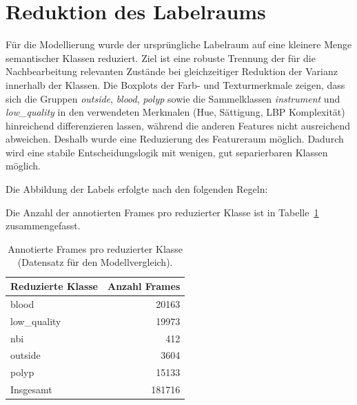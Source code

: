 \section{Reduktion des Labelraums}

Für die Modellierung wurde der ursprüngliche Labelraum auf eine kleinere Menge semantischer Klassen reduziert. Ziel ist eine robuste Trennung der für die Nachbearbeitung relevanten Zustände bei gleichzeitiger Reduktion der Varianz innerhalb der Klassen. Die Boxplots der Farb- und Texturmerkmale zeigen, dass sich die Gruppen \emph{outside}, \emph{blood}, \emph{polyp} sowie die Sammelklassen \emph{instrument} und \emph{low\_quality} in den verwendeten Merkmalen (Hue, Sättigung, LBP Komplexität) hinreichend differenzieren lassen, während die anderen Features nicht ausreichend abweichen. Deshalb wurde eine Reduzierung des Featureraum möglich. Dadurch wird eine stabile Entscheidungslogik mit wenigen, gut separierbaren Klassen möglich.

Die Abbildung der Labels erfolgte nach den folgenden Regeln:
\begin{table}[htbp]
    \centering
    \caption{Abbildung der ursprünglichen Labels auf reduzierte Klassen.}
    \label{tab:label_reduction}
\end{table}

Die Anzahl der annotierten Frames pro reduzierter Klasse ist in Tabelle~\ref{tab:label_counts_reduced} zusammengefasst.
\begin{table}[htbp]
    \centering
    \caption{Annotierte Frames pro reduzierter Klasse (Datensatz für den Modellvergleich).}
    \label{tab:label_counts_reduced}
    \begin{tabular}{@{}lr@{}}
    \toprule
    Reduzierte Klasse & Anzahl Frames \\ \midrule
    blood & 20163 \\
    low\_quality & 19973 \\
    nbi & 412 \\
    outside & 3604 \\
    polyp & 15133 \\ 
    Insgesamt & 181716\\
    \bottomrule
    \end{tabular}
\end{table}

